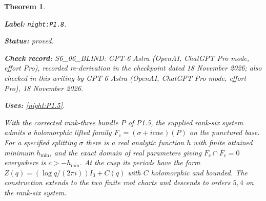 \documentclass[11pt,a4paper]{article}
\newtheorem{theorem}{Theorem}[section]
\theoremstyle{definition}
\newcommand{\StatementRecord}[4]{\par\smallskip\begingroup\upshape\raggedright\noindent\textbf{Label:} \nolinkurl{#1}.\par\noindent\textbf{Status:} #2.\par\noindent\textbf{Check record:} #3.\par\noindent\textbf{Uses:} #4.\par\endgroup\smallskip}
\newcommand{\CurrentChecker}{GPT-6 Astra (OpenAI, ChatGPT Pro mode, effort Pro), 18 November 2026}
\begin{document}
\begin{theorem}\label{night:P1.8}
\StatementRecord{night:P1.8}{proved}{S6\_06\_BLIND: GPT-6 Astra (OpenAI, ChatGPT Pro mode, effort Pro), recorded re-derivation in the checkpoint dated 18 November 2026; also checked in this writing by \CurrentChecker}{\cref{night:P1.5}}
With the corrected rank-three bundle $P$ of P1.5, the supplied rank-six
system admits a holomorphic lifted family
$F_c=(\sigma+ic\alpha e)(P)$ on the punctured base.
For a specified splitting $\sigma$ there is a real analytic function
$h$ with finite attained minimum $h_{\min}$, and the exact domain of
real parameters giving $F_c\cap\overline{F_c}=0$ everywhere is
$c>-h_{\min}$.
At the cusp its periods have the form
$Z(q)=(\log q/(2\pi i))I_3+C(q)$ with $C$ holomorphic and bounded.
The construction extends to the two finite root charts and descends to
orders $5,4$ on the rank-six system.
\end{theorem}
\end{document}
